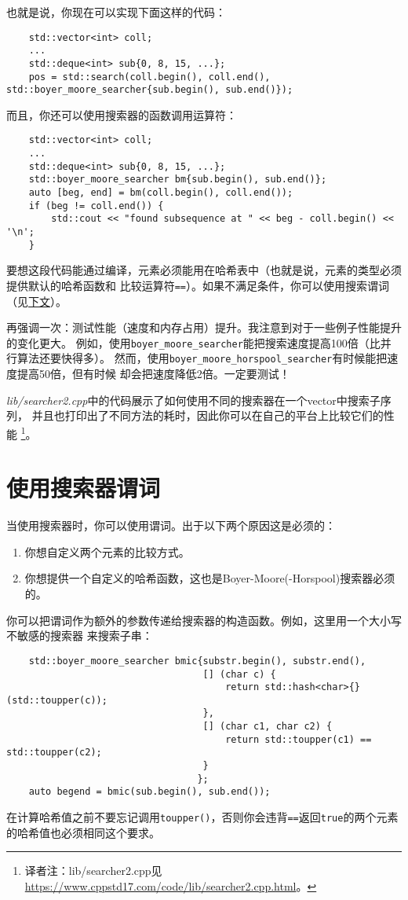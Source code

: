 也就是说，你现在可以实现下面这样的代码：
\begin{lstlisting}
    std::vector<int> coll;
    ...
    std::deque<int> sub{0, 8, 15, ...};
    pos = std::search(coll.begin(), coll.end(), std::boyer_moore_searcher{sub.begin(), sub.end()});
\end{lstlisting}
而且，你还可以使用搜索器的函数调用运算符：
\begin{lstlisting}
    std::vector<int> coll;
    ...
    std::deque<int> sub{0, 8, 15, ...};
    std::boyer_moore_searcher bm{sub.begin(), sub.end()};
    auto [beg, end] = bm(coll.begin(), coll.end());
    if (beg != coll.end()) {
        std::cout << "found subsequence at " << beg - coll.begin() << '\n';
    }
\end{lstlisting}
要想这段代码能通过编译，元素必须能用在哈希表中（也就是说，元素的类型必须提供默认的哈希函数和
比较运算符\texttt{==}）。如果不满足条件，你可以使用搜索谓词（见\hyperref[ch24.3]{下文}）。

再强调一次：测试性能（速度和内存占用）提升。我注意到对于一些例子性能提升的变化更大。
例如，使用\texttt{boyer\_moore\_searcher}能把搜索速度提高100倍（比并行算法还要快得多）。
然而，使用\texttt{boyer\_moore\_horspool\_searcher}有时候能把速度提高50倍，但有时候
却会把速度降低2倍。一定要测试！

\emph{lib/searcher2.cpp}中的代码展示了如何使用不同的搜索器在一个vector中搜索子序列，
并且也打印出了不同方法的耗时，因此你可以在自己的平台上比较它们的性能
\footnote{译者注：lib/searcher2.cpp见\url{https://www.cppstd17.com/code/lib/searcher2.cpp.html}。}。

\section{使用搜索器谓词}\label{ch24.3}
当使用搜索器时，你可以使用谓词。出于以下两个原因这是必须的：
\begin{enumerate}
    \item 你想自定义两个元素的比较方式。
    \item 你想提供一个自定义的哈希函数，这也是Boyer-Moore(-Horspool)搜索器必须的。
\end{enumerate}
你可以把谓词作为额外的参数传递给搜索器的构造函数。例如，这里用一个大小写不敏感的搜索器
来搜索子串：
\begin{lstlisting}
    std::boyer_moore_searcher bmic{substr.begin(), substr.end(),
                                   [] (char c) {
                                       return std::hash<char>{}(std::toupper(c));
                                   },
                                   [] (char c1, char c2) {
                                       return std::toupper(c1) == std::toupper(c2);
                                   }
                                  };
    auto begend = bmic(sub.begin(), sub.end());
\end{lstlisting}
在计算哈希值之前不要忘记调用\texttt{toupper()}，否则你会违背\texttt{==}返回\texttt{true}的两个元素
的哈希值也必须相同这个要求。

